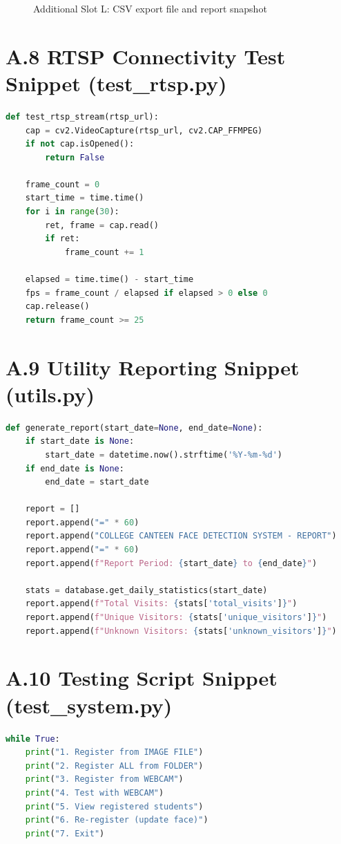 \documentclass{fisatprojectfinal}
\begin{document}
\begin{appendices}
\begin{figure}[h!]
	\begin{center}
		\fbox{\rule{0pt}{2.9in}\rule{0.90\linewidth}{0pt}}
		\caption{Additional Slot L: CSV export file and report snapshot}
	\end{center}
\end{figure}

\section*{A.8 RTSP Connectivity Test Snippet (test\_rtsp.py)}
\begin{lstlisting}[language=Python,caption={RTSP stream test before full system execution}]
def test_rtsp_stream(rtsp_url):
    cap = cv2.VideoCapture(rtsp_url, cv2.CAP_FFMPEG)
    if not cap.isOpened():
        return False

    frame_count = 0
    start_time = time.time()
    for i in range(30):
        ret, frame = cap.read()
        if ret:
            frame_count += 1

    elapsed = time.time() - start_time
    fps = frame_count / elapsed if elapsed > 0 else 0
    cap.release()
    return frame_count >= 25
\end{lstlisting}

\section*{A.9 Utility Reporting Snippet (utils.py)}
\begin{lstlisting}[language=Python,caption={Daily report creation logic}]
def generate_report(start_date=None, end_date=None):
	if start_date is None:
		start_date = datetime.now().strftime('%Y-%m-%d')
	if end_date is None:
		end_date = start_date

	report = []
	report.append("=" * 60)
	report.append("COLLEGE CANTEEN FACE DETECTION SYSTEM - REPORT")
	report.append("=" * 60)
	report.append(f"Report Period: {start_date} to {end_date}")

	stats = database.get_daily_statistics(start_date)
	report.append(f"Total Visits: {stats['total_visits']}")
	report.append(f"Unique Visitors: {stats['unique_visitors']}")
	report.append(f"Unknown Visitors: {stats['unknown_visitors']}")
\end{lstlisting}

\section*{A.10 Testing Script Snippet (test\_system.py)}
\begin{lstlisting}[language=Python,caption={Interactive test menu for registration and recognition validation}]
while True:
	print("1. Register from IMAGE FILE")
	print("2. Register ALL from FOLDER")
	print("3. Register from WEBCAM")
	print("4. Test with WEBCAM")
	print("5. View registered students")
	print("6. Re-register (update face)")
	print("7. Exit")


\end{lstlisting}
\end{appendices}
\end{document}
